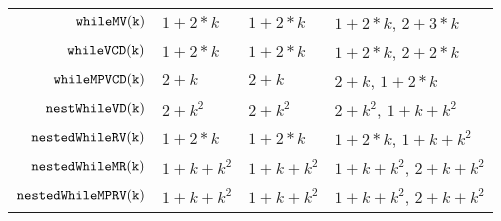 \begin {table}[H]
\begin{center}
{\begin{tabular}{ r | p{12mm} | p{60mm} | p{30mm}}
         $ \mathtt{whileMV(k)}$ & $1 + 2*k$ & $1 + 2*k$ & $1 + 2*k$, $2 + 3 * k$  \\
         $ \mathtt{whileVCD(k)}$ & $1 + 2*k$ & $1 + 2*k$ & $1 + 2 * k$, $2 + 2 * k$  \\
         $ \mathtt{whileMPVCD(k)}$ & $2 + k$ & $2 + k$  & $2 + k$, $1 + 2 * k$   \\
         $ \mathtt{nestWhileVD(k)}$ & $2 + k^2$ & $2 + k^2$  & $2 + k^2$, $1 + k + k^2$   \\
         $ \mathtt{nestedWhileRV(k)}$ & $1 + 2*k$ & $1 + 2*k$ & $1 + 2*k$,  $1 + k + k^2$   \\
         $ \mathtt{nestedWhileMR(k)}$ & $1 + k + k^2$ & $1 + k + k^2$  & $1 + k + k^2$,  $2 + k + k^2$  \\
         $ \mathtt{nestedWhileMPRV(k)}$ & $1 + k + k^2$ & $1 + k + k^2$  & $1 + k + k^2$,  $2 + k + k^2$  \\
        \end{tabular}
}        
\end{center}
\end{table}
    

